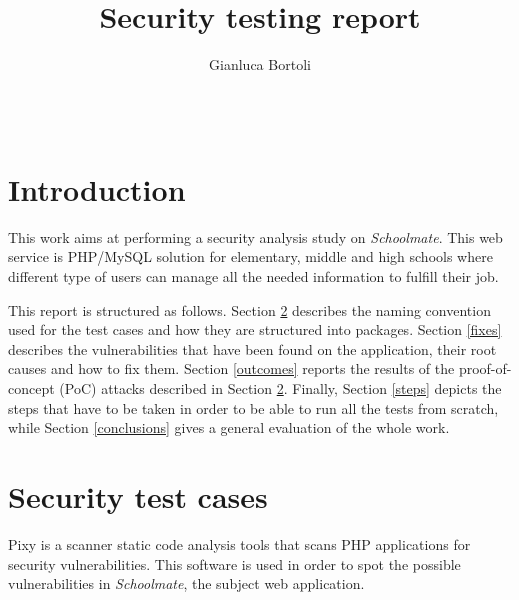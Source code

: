 \documentclass{sig-alternate-05-2015}
\begin{document}
\title{Security testing report}

\author{
    Gianluca Bortoli\\
           \\
           \\
}
\maketitle


\section{Introduction}
This work aims at performing a security analysis study on \emph{Schoolmate}.
This web service is PHP/MySQL solution for elementary,
middle and high schools where different type of users can manage all the needed
information to fulfill their job.

This report is structured as follows. Section \ref{tests} describes the naming
convention used for the test cases and how they are structured into packages.
Section \ref{fixes} describes the vulnerabilities that have been found on the
application, their root causes and how to fix them. Section \ref{outcomes} reports
the results of the proof-of-concept (PoC) attacks described in Section \ref{tests}.
Finally, Section \ref{steps} depicts the steps that have to be taken in order to
be able to run all the tests from scratch, while Section \ref{conclusions} gives
a general evaluation of the whole work.


\section{Security test cases}\label{tests}
Pixy is a scanner static code analysis tools that scans PHP applications for
security vulnerabilities. This software is used in order to spot the possible
vulnerabilities in \emph{Schoolmate}, the subject web application.
\end{document}

